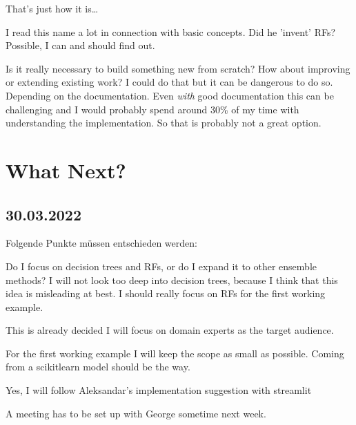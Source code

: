 \documentclass[a4paper, 12pt]{article}
\begin{document}
\begin{description}[font=$\bullet$~\normalfont]
        \textemdash That's just how it is\dots 
        \item[Breimann:]I read this name a lot in connection with basic concepts. Did he 'invent' RFs?
        \textemdash Possible, I can and should find out. 
        \item[Build new or improve old:]Is it really necessary to build something new from scratch? How about
        improving or extending existing work?
        \textemdash I could do that but it can be dangerous to do so. Depending on the documentation. Even
        \textit{with} good documentation this can be challenging and I would probably spend around 30\% of my time
        with understanding the implementation. So that is probably not a great option.
\end{description}

\section{What Next?}
\subsection{30.03.2022}
Folgende Punkte müssen entschieden werden:
\begin{description}[font=$\bullet$~\normalfont]
        \item[Focus:] Do I focus on decision trees and RFs, or do I expand it to other ensemble methods?
        \textemdash I will not look too deep into decision trees, because I think that this idea is misleading at
        best. I should really focus on RFs for the first working example.
        \item[Target audience:] This is already decided \textemdash I will focus on domain experts as the target
        audience.
        \item[Scope:]For the first working example I will keep the scope as small as possible. Coming from a
        scikitlearn model should be the way.
        \item[Build new:]Yes, I will follow Aleksandar's implementation suggestion with streamlit 
\end{description}

A meeting has to be set up with George sometime next week.


\clearpage


\end{document}
